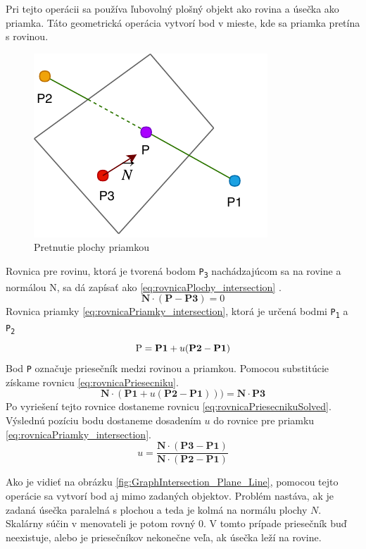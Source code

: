 Pri tejto operácii sa používa ľubovolný plošný objekt ako rovina a úsečka ako priamka. Táto geometrická operácia vytvorí bod v mieste, kde sa priamka pretína s rovinou. 


\begin{figure}[H]
	\centering
	\includegraphics[height=0.3\textwidth]{obrazky-figures/DP Navrh operacii-Intersection.pdf}
	\caption{Pretnutie plochy priamkou}
	\label{fig:Intersection}
\end{figure}


Rovnica pre rovinu, ktorá je tvorená bodom \texttt{P\textsubscript{3}} nachádzajúcom sa na rovine a normálou N, sa dá zapísať ako \ref{eq:rovnicaPlochy_intersection} \cite{bourke_Point_Line_Plane}. 
\begin{equation}
    \textbf{N} \cdot (\textbf{P} - \textbf{P3}) = 0
	\label{eq:rovnicaPlochy_intersection}
\end{equation}
Rovnica priamky \ref{eq:rovnicaPriamky_intersection}, ktorá je určená bodmi \texttt{P\textsubscript{1}} a \texttt{P\textsubscript{2}}
\begin{equation}
	\textup{P}=\textbf{P1}+u (\textbf{P2}-\textbf{P1})
    \label{eq:rovnicaPriamky_intersection}
\end{equation}
Bod \texttt{P} označuje priesečník medzi rovinou a priamkou. Pomocou substitúcie získame rovnicu \ref{eq:rovnicaPriesecniku}.
\begin{equation}
	\textbf{N} \cdot (\textbf{P1}+u(\textbf{P2}-\textbf{P1}))) = \textbf{N} \cdot \textbf{P3}
    \label{eq:rovnicaPriesecniku}
\end{equation}
Po vyriešení tejto rovnice dostaneme rovnicu \ref{eq:rovnicaPriesecnikuSolved}. Výslednú pozíciu bodu dostaneme dosadením $u$ do rovnice pre  priamku \ref{eq:rovnicaPriamky_intersection}.
\begin{equation}
	u=\frac
{\textbf{N} \cdot (\textbf{P3}-\textbf{P1})}
{\textbf{N} \cdot (\textbf{P2}-\textbf{P1})}
    \label{eq:rovnicaPriesecnikuSolved}
\end{equation}


Ako je vidieť na obrázku \ref{fig:GraphIntersection_Plane_Line}, pomocou tejto operácie sa vytvorí bod aj mimo zadaných objektov. Problém nastáva, ak je zadaná úsečka paralelná s plochou a teda je kolmá na normálu plochy $N$. Skalárny súčin v menovateli je potom rovný 0. V tomto prípade priesečník buď neexistuje, alebo je priesečníkov nekonečne veľa, ak úsečka leží na rovine.

